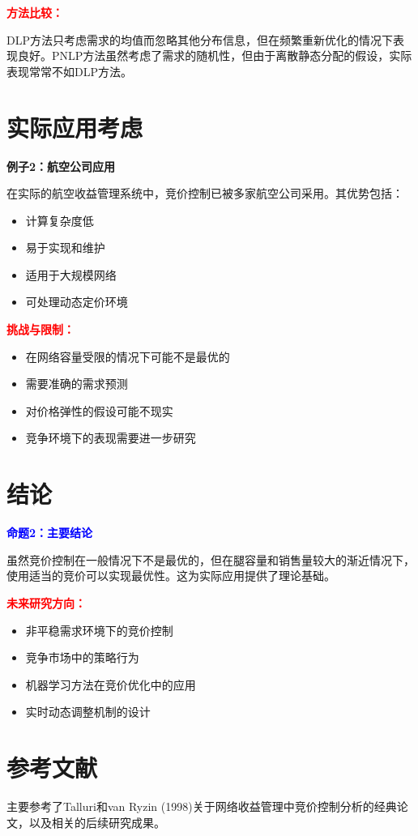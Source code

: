\documentclass[12pt,a4paper]{article}
\begin{document}
\textcolor{red}{\textbf{方法比较：}}

DLP方法只考虑需求的均值而忽略其他分布信息，但在频繁重新优化的情况下表现良好。PNLP方法虽然考虑了需求的随机性，但由于离散静态分配的假设，实际表现常常不如DLP方法。

\section{实际应用考虑}

\textbf{例子2：航空公司应用}

在实际的航空收益管理系统中，竞价控制已被多家航空公司采用。其优势包括：
\begin{itemize}
\item 计算复杂度低
\item 易于实现和维护
\item 适用于大规模网络
\item 可处理动态定价环境
\end{itemize}

\textcolor{red}{\textbf{挑战与限制：}}

\begin{itemize}
\item 在网络容量受限的情况下可能不是最优的
\item 需要准确的需求预测
\item 对价格弹性的假设可能不现实
\item 竞争环境下的表现需要进一步研究
\end{itemize}

\section{结论}

\textcolor{blue}{\textbf{命题2：主要结论}}

虽然竞价控制在一般情况下不是最优的，但在腿容量和销售量较大的渐近情况下，使用适当的竞价可以实现最优性。这为实际应用提供了理论基础。

\textcolor{red}{\textbf{未来研究方向：}}

\begin{itemize}
\item 非平稳需求环境下的竞价控制
\item 竞争市场中的策略行为
\item 机器学习方法在竞价优化中的应用
\item 实时动态调整机制的设计
\end{itemize}

\section{参考文献}

主要参考了Talluri和van Ryzin (1998)关于网络收益管理中竞价控制分析的经典论文，以及相关的后续研究成果。
\end{document}
